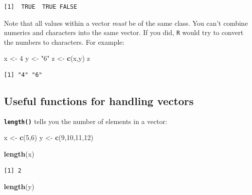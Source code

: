 \documentclass[
]{book}
\newenvironment{Shaded}{\begin{snugshade}}{\end{snugshade}}
\newcommand{\DecValTok}[1]{\textcolor[rgb]{0.00,0.00,0.81}{#1}}
\newcommand{\KeywordTok}[1]{\textcolor[rgb]{0.13,0.29,0.53}{\textbf{#1}}}
\newcommand{\NormalTok}[1]{#1}
\newcommand{\StringTok}[1]{\textcolor[rgb]{0.31,0.60,0.02}{#1}}
\begin{document}
\begin{verbatim}
[1]  TRUE  TRUE FALSE
\end{verbatim}

Note that all values within a vector \emph{must} be of the same class. You can't combine numerics and characters into the same vector. If you did, \texttt{R} would try to convert the numbers to characters. For example:

\begin{Shaded}
\begin{Highlighting}[]
\NormalTok{x <-}\StringTok{ }\DecValTok{4}
\NormalTok{y <-}\StringTok{ "6"}
\NormalTok{z <-}\StringTok{ }\KeywordTok{c}\NormalTok{(x,y)}
\NormalTok{z}
\end{Highlighting}
\end{Shaded}

\begin{verbatim}
[1] "4" "6"
\end{verbatim}

\hypertarget{useful-functions-for-handling-vectors}{%
\subsection*{Useful functions for handling vectors}\label{useful-functions-for-handling-vectors}}

\textbf{\texttt{length()}} tells you the number of elements in a vector:

\begin{Shaded}
\begin{Highlighting}[]
\NormalTok{x <-}\StringTok{ }\KeywordTok{c}\NormalTok{(}\DecValTok{5}\NormalTok{,}\DecValTok{6}\NormalTok{)}
\NormalTok{y <-}\StringTok{ }\KeywordTok{c}\NormalTok{(}\DecValTok{9}\NormalTok{,}\DecValTok{10}\NormalTok{,}\DecValTok{11}\NormalTok{,}\DecValTok{12}\NormalTok{)}

\KeywordTok{length}\NormalTok{(x)}
\end{Highlighting}
\end{Shaded}

\begin{verbatim}
[1] 2
\end{verbatim}

\begin{Shaded}
\begin{Highlighting}[]
\KeywordTok{length}\NormalTok{(y)}
\end{Highlighting}
\end{Shaded}
\end{document}

